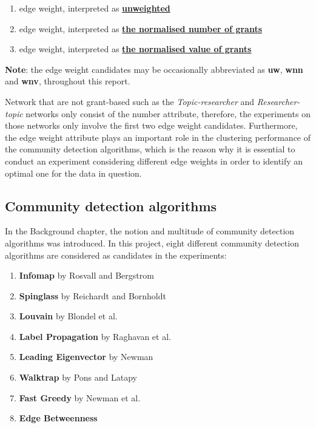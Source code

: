 \begin{enumerate}[noitemsep]
    \item edge weight, interpreted as \underline{\textbf{unweighted}}
    \item edge weight, interpreted as \underline{\textbf{the normalised number of grants}}
    \item edge weight, interpreted as \underline{\textbf{the normalised value of grants}}
\end{enumerate}

\noindent \textbf{Note}: the edge weight candidates may be occasionally abbreviated as \textbf{uw}, \textbf{wnn} and \textbf{wnv}, throughout this report.

Network that are not grant-based such as the \textit{Topic-researcher} and \textit{Researcher-topic} networks only consist of the number attribute, therefore, the experiments on those networks only involve the first two edge weight candidates. Furthermore, the edge weight attribute plays an important role in the clustering performance of the community detection algorithms, which is the reason why it is essential to conduct an experiment considering different edge weights in order to identify an optimal one for the data in question.

\subsection{Community detection algorithms}

In the Background chapter, the notion and multitude of community detection algorithms was introduced. In this project, eight different community detection algorithms are considered as candidates in the experiments:

\begin{enumerate}[noitemsep]
    \item \textbf{Infomap} by Rosvall and Bergstrom
    \item \textbf{Spinglass} by Reichardt and Bornholdt
    \item \textbf{Louvain} by Blondel et al.
    \item \textbf{Label Propagation} by Raghavan et al.
    \item \textbf{Leading Eigenvector} by Newman
    \item \textbf{Walktrap} by Pons and Latapy
    \item \textbf{Fast Greedy} by Newman et al.
    \item \textbf{Edge Betweenness}
\end{enumerate}

